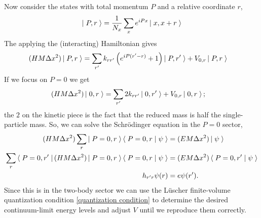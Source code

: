 Now consider the states with total momentum $P$ and a relative coordinate $r$,
\begin{align}
	\left|\;P,r\;\right\rangle = \frac{1}{N_x} \sum_x e^{iPx} \left|\;x,x+r\;\right\rangle
\end{align}
The applying the (interacting) Hamiltonian gives
\begin{align}
	(H M\Delta x^2) \left|\;P,r\;\right\rangle
	&=
			\sum_{r'} k_{rr'} \left( e^{iP(r'-r)}+1\right)\left|\;P,r'\;\right\rangle
		+	V_{0,r} \left|\;P,r\;\right\rangle
\end{align}
If we focus on $P=0$ we get
\begin{align}
	(H M\Delta x^2) \left|\;0,r\;\right\rangle
	&=
			\sum_{r'} 2k_{rr'} \left|\;0,r'\;\right\rangle
		+	V_{0,r} \left|\;0,r\;\right\rangle;
\end{align}
the $2$ on the kinetic piece is the fact that the reduced mass is half the single-particle mass.
So, we can solve the Schr\"{o}dinger equation in the $P=0$ sector,
\begin{align}
	(H M\Delta x^2) \sum_r \left|\;P=0,r\;\right\rangle\left\langle\;P=0,r\;\middle|\;\psi\;\right\rangle &= (EM\Delta x^2)\left|\;\psi\;\right\rangle
	\\
	\sum_r \left\langle\;P=0, r'\;\right| (H M \Delta x^2) \left|\;P=0,r\;\right\rangle\left\langle\;P=0,r\;\middle|\;\psi\;\right\rangle &= (E M\Delta x^2)\left\langle\;P=0,r'\;\middle|\;\psi\;\right\rangle
	\\
	h_{r'r} \psi(r) &= e \psi(r').
\end{align}
Since this is in the two-body sector we can use the L\"{u}scher finite-volume quantization condition \eqref{quantization condition} to determine the desired continuum-limit energy levels and adjust $V$ until we reproduce them correctly.
